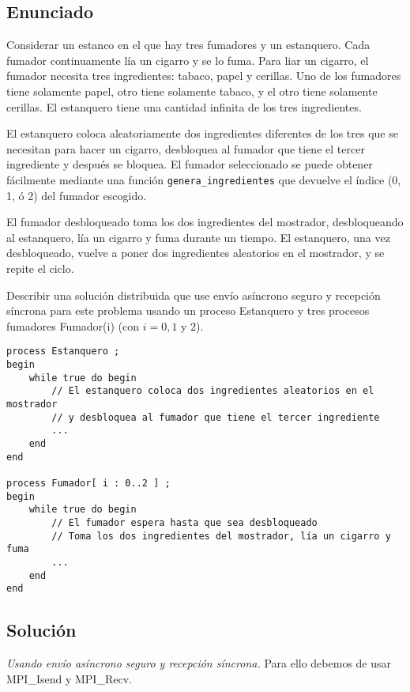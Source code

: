 \documentclass[a4paper,12pt]{article}
\begin{document}
\subsection{Enunciado}

Considerar un estanco en el que hay tres fumadores y un estanquero. Cada fumador continuamente lía un cigarro y se lo fuma. Para liar un cigarro, el fumador necesita tres ingredientes: tabaco, papel y cerillas. Uno de los fumadores tiene solamente papel, otro tiene solamente tabaco, y el otro tiene solamente cerillas. El estanquero tiene una cantidad infinita de los tres ingredientes.

El estanquero coloca aleatoriamente dos ingredientes diferentes de los tres que se necesitan para hacer un cigarro, desbloquea al fumador que tiene el tercer ingrediente y después se bloquea. El fumador seleccionado se puede obtener fácilmente mediante una función \texttt{genera\_ingredientes} que devuelve el índice (0, 1, ó 2) del fumador escogido.

El fumador desbloqueado toma los dos ingredientes del mostrador, desbloqueando al estanquero, lía un cigarro y fuma durante un tiempo. El estanquero, una vez desbloqueado, vuelve a poner dos ingredientes aleatorios en el mostrador, y se repite el ciclo.

Describir una solución distribuida que use envío asíncrono seguro y recepción síncrona para este problema usando un proceso Estanquero y tres procesos fumadores Fumador(i) (con $i=0,1$ y $2$).

\begin{lstlisting}[style=customcpp]
process Estanquero ;
begin
    while true do begin
        // El estanquero coloca dos ingredientes aleatorios en el mostrador
        // y desbloquea al fumador que tiene el tercer ingrediente
        ...
    end
end

process Fumador[ i : 0..2 ] ;
begin
    while true do begin
        // El fumador espera hasta que sea desbloqueado
        // Toma los dos ingredientes del mostrador, lía un cigarro y fuma
        ...
    end
end
\end{lstlisting}

\subsection{Solución}

\textit{Usando envío asíncrono seguro y recepción síncrona.} Para ello debemos de usar MPI\_Isend y MPI\_Recv.
\end{document}
